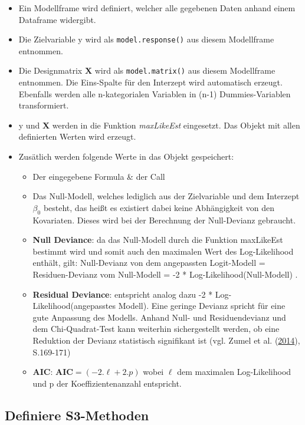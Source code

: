 \documentclass[12pt,]{article}
\providecommand{\tightlist}{%
  \setlength{\itemsep}{0pt}\setlength{\parskip}{0pt}}
\begin{document}
\begin{itemize}
\item
  Ein Modellframe wird definiert, welcher alle gegebenen Daten anhand
  einem Dataframe widergibt.
\item
  Die Zielvariable y wird als \texttt{model.response()} aus diesem
  Modellframe entnommen.
\item
  Die Designmatrix \(\mathbf{X}\) wird als \texttt{model.matrix()} aus
  diesem Modellframe entnommen. Die Eins-Spalte für den Interzept wird
  automatisch erzeugt. Ebenfalls werden alle n-kategorialen Variablen in
  (n-1) Dummies-Variablen transformiert.
\item
  y und \(\mathbf{X}\) werden in die Funktion \emph{maxLikeEst}
  eingesetzt. Das Objekt mit allen definierten Werten wird erzeugt.
\item
  Zusätlich werden folgende Werte in das Objekt gespeichert:

  \begin{itemize}
  \tightlist
  \item
    Der eingegebene Formula \& der Call
  \item
    Das Null-Modell, welches lediglich aus der Zielvariable und dem
    Interzept \(\beta_0\) besteht, das heißt es existiert dabei keine
    Abhängigkeit von den Kovariaten. Dieses wird bei der Berechnung der
    Null-Devianz gebraucht.
  \item
    \textbf{Null Deviance}: da das Null-Modell durch die Funktion
    maxLikeEst bestimmt wird und somit auch den maximalen Wert des
    Log-Likelihood enthält, gilt: Null-Devianz von dem angepassten
    Logit-Modell = Residuen-Devianz vom Null-Modell = -2 *
    Log-Likelihood(Null-Modell) .
  \item
    \textbf{Residual Deviance}: entspricht analog dazu -2 *
    Log-Likelihood(angepasstes Modell). Eine geringe Devianz spricht für
    eine gute Anpassung des Modells. Anhand Null- und Residuendevianz
    und dem Chi-Quadrat-Test kann weiterhin sichergestellt werden, ob
    eine Reduktion der Devianz statistisch signifikant ist (vgl. Zumel
    et al. (\protect\hyperlink{ref-zumel2014practical}{2014}),
    S.169-171)
  \item
    \textbf{AIC}: \(\mathbf{AIC} = (-2.\ell + 2.p)\) wobei \({\ell}\)
    dem maximalen Log-Likelihood und p der Koeffizientenanzahl
    entspricht.
  \end{itemize}
\end{itemize}

\subsection{Definiere S3-Methoden}\label{definiere-s3-methoden}
\end{document}
